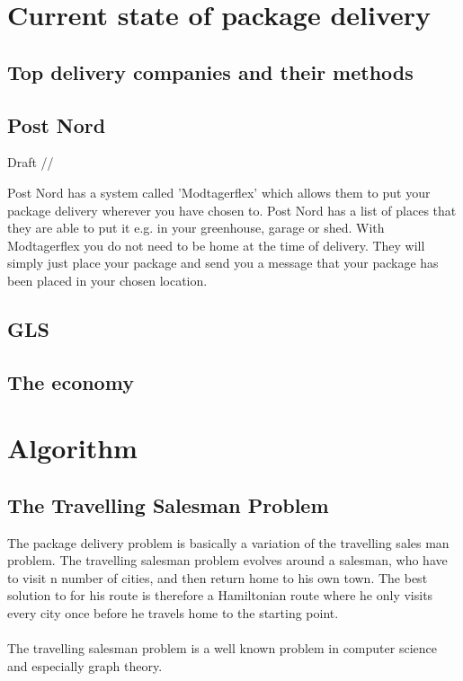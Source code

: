 \documentclass[12pt]{report}
\begin{document}
\section{Current state of package delivery}
\subsection{Top delivery companies and their methods}


\subsection{Post Nord}
Draft //

Post Nord has a system called 'Modtagerflex' which allows them to put your package delivery wherever you have chosen to. Post Nord has a list of places that they are able to put it e.g. in your greenhouse, garage or shed. With Modtagerflex you do not need to be home at the time of delivery. They will simply just place your package and send you a message that your package has been placed in your chosen location.


\subsection{GLS}


\subsection{The economy}



\section{Algorithm}
\subsection{The Travelling Salesman Problem}
The package delivery problem is basically a variation of the travelling sales man problem. The travelling salesman problem evolves around a salesman, who have to visit n number of cities, and then return home to his own town. The best solution to for his route is therefore a Hamiltonian route where he only visits every city once before he travels home to the starting point. \\ \\
The travelling salesman problem is a well known problem in computer science and especially graph theory.  
\end{document}
